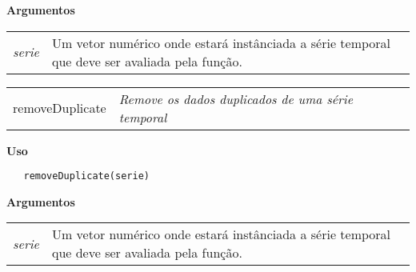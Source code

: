 \documentclass[12pt,letterpaper]{article}
\begin{document}
\vspace{0.5cm}

\textbf{Argumentos}

\begin{table}[!h]
\begin{center}
\begin{tabularx}{\textwidth}{X X}
\hspace{0.5cm} \textit{serie} & Um vetor numérico onde estará instânciada a série temporal que deve ser avaliada pela função.\\
\end{tabularx}
\end{center}
\end{table} 

\newpage


\hrulefill   

\begin{table}[!h]
\begin{center}
\begin{tabularx}{\textwidth}{X X}
\hspace{0.5cm} removeDuplicate & \textit{Remove os dados duplicados de uma série temporal}\\
\end{tabularx}
\end{center}
\end{table} 

\vspace{-0.5cm}

\hrulefill  

\vspace{0.5cm}

\textbf{Uso}

\begin{lstlisting}
   removeDuplicate(serie)
\end{lstlisting}

\vspace{0.5cm}

\textbf{Argumentos}

\begin{table}[!h]
\begin{center}
\begin{tabularx}{\textwidth}{X X}
\hspace{0.5cm} \textit{serie} & Um vetor numérico onde estará instânciada a série temporal que deve ser avaliada pela função.\\
\end{tabularx}
\end{center}
\end{table} 
\end{document}
